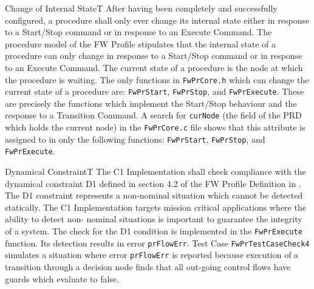 \documentclass[requirements]{../fwprofile}
\begin{document}
\begin{fw_req}{Change of Internal State}{T}
{After having been completely and successfully configured, a procedure shall 
only ever change its internal state either in response to a Start/Stop command or in response to 
an Execute Command.}
{The procedure model of the FW Profile stipulates that the internal state 
of a procedure can only change in response to a Start/Stop command or in response to an Execute 
Command.}
{The current state of a procedure is the node at which the procedure is 
waiting.
The only functions in \texttt{FwPrCore.h} which can change the current state of a procedure 
are: \texttt{FwPrStart}, \texttt{FwPrStop}, and \texttt{FwPrExecute}. 
These are precisely the functions which implement the Start/Stop behaviour and the response to a 
Transition Command.} 
{A search for \texttt{curNode} (the field of the PRD which holds the 
current node) in the \texttt{FwPrCore.c} file shows that this attribute is assigned to in only 
the following functions: \texttt{FwPrStart}, \texttt{FwPrStop}, and \texttt{FwPrExecute}.}
\end{fw_req}


\begin{fw_req}{Dynamical Constraint}{T}
{The C1 Implementation shall check compliance with the dynamical constraint 
D1 defined in section 4.2 of the FW Profile Definition in \cite{ref:fwprofile}.}
{The D1 constraint represents a non-nominal situation which cannot be detected statically. 
The C1 Implementation targets mission critical applications where the ability to detect non-
nominal situations is important to guarantee the integrity of a system.}
{The check for the D1 condition is implemented in the 
\texttt{FwPrExecute} function. 
Its detection results in error \texttt{prFlowErr}.} 
{Test Case \texttt{FwPrTestCaseCheck4} simulates a situation where error 
\texttt{prFlowErr} is reported because execution of a transition through a decision node finds 
that all out-going control flows have guards which evaluate to false.}
\end{fw_req}
\end{document}
